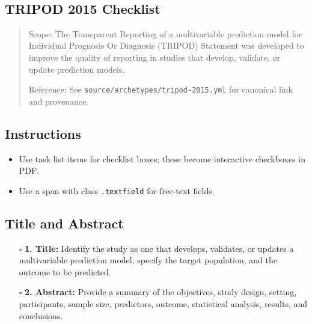 \documentclass[11pt]{article}
\def\tightlist{}
\begin{document}
\begin{center}
{\LARGE }\\[4pt]
\normalsize 
\end{center}
\vspace{1em}

\begin{Form}

\section{TRIPOD 2015 Checklist}\label{tripod-2015-checklist}

\begin{quote}
Scope: The Transparent Reporting of a multivariable prediction model for
Individual Prognosis Or Diagnosis (TRIPOD) Statement was developed to
improve the quality of reporting in studies that develop, validate, or
update prediction models.

Reference: See \texttt{source/archetypes/tripod-2015.yml} for canonical
link and provenance.
\end{quote}

\subsection{Instructions}\label{instructions}

\begin{itemize}
\tightlist
\item
  Use task list items for checklist boxes; these become interactive
  checkboxes in PDF.
\item
  Use a span with class \texttt{.textfield} for free‑text fields.
\end{itemize}

\subsection{Title and Abstract}\label{title-and-abstract}

\begin{itemize}
\tightlist
\item[$\square$]
  \textbf{1. Title:} Identify the study as one that develops, validates,
  or updates a multivariable prediction model, specify the target
  population, and the outcome to be predicted.
\item[$\square$]
  \textbf{2. Abstract:} Provide a summary of the objectives, study
  design, setting, participants, sample size, predictors, outcome,
  statistical analysis, results, and conclusions.
\end{itemize}


\end{Form}
\end{document}
